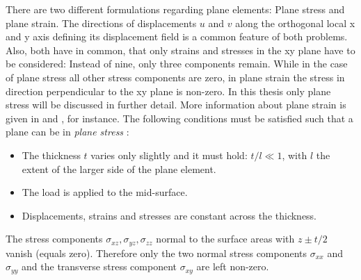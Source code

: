   There are two different formulations regarding plane elements: Plane stress and plane strain. The directions of displacements $u$ and $v$ along the orthogonal local x and y axis defining its displacement field is a common feature of both problems. Also, both have in common, that only strains and stresses in the xy plane have to be considered: Instead of nine, only three components remain. While in the case of plane stress all other stress components are zero, in plane strain the stress in direction perpendicular to the xy plane is non-zero. In this thesis only plane stress will be discussed in further detail. More information about plane strain is given in \cite{zienkiewicz2000finite} and \cite{braess2007finite}, for instance.
  The following conditions must be satisfied such that a plane can be in \textit{plane stress} \cite{steinke2005finite}:
  \begin{itemize}
  	\item The thickness $t$ varies only slightly and it must hold: $t/l \ll 1$, with $l$ the extent of the larger side of the plane element.
  	\item The load is applied to the mid-surface.
  	\item Displacements, strains and stresses are constant across the thickness.
  \end{itemize}
  The stress components $\sigma_{xz},\sigma_{yz},\sigma_{zz}$ normal to the surface areas with $z \pm t/2$ vanish (equals zero). Therefore only the two normal stress components $\sigma_{xx}$ and $\sigma_{yy}$ and the transverse stress component $\sigma_{xy}$ are left non-zero.
    
